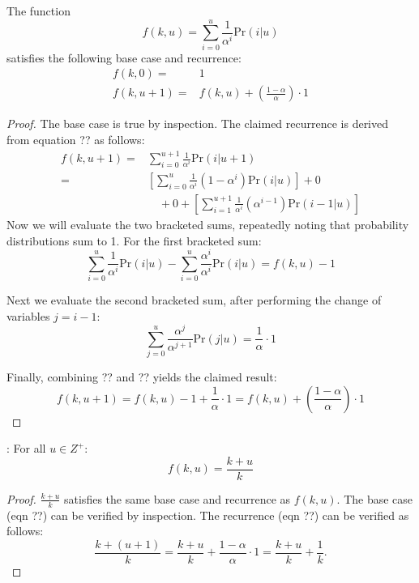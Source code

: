 \documentclass{sig-alternate}
\begin{document}
 The function
\[
f(k,u) = \sum_{i=0}^u \frac{1}{\alpha^i} \mathrm{Pr}(i|u)
\]
satisfies the following base case and recurrence:
\begin{align}
      f(k,0) = & 1 \\
f(k,u\!+\!1) = & f(k,u) + \left(\frac{1-\alpha}{\alpha}\right) \cdot 1
\end{align}
\begin{proof} The base case is true by inspection. The claimed recurrence is derived from equation ?? as follows:
\begin{align} 
  f(k,u\!+\!1)
= & \sum_{i=0}^{u+1} \frac{1}{\alpha^i} \mathrm{Pr}(i|u+1) \\
= & \left[ \sum_{i=0}^{u} \frac{1}{\alpha^i} (1-\alpha^i) \mathrm{Pr}(i|u) \right] + 0 \\
  & \quad + 0 + \left[ \sum_{i=1}^{u+1} \frac{1}{\alpha^i} (\alpha^{i-1}) \mathrm{Pr}(i\!-\!1|u) \right]
\end{align}
\noindent Now we will evaluate the two bracketed sums, repeatedly noting that probability distributions sum to 1.
For the first bracketed sum:
\begin{equation}
\sum_{i=0}^u \frac{1}{\alpha^i} \mathrm{Pr}(i|u) - \sum_{i=0}^u \frac{\alpha^i}{\alpha^i} \mathrm{Pr}(i|u) = f(k,u) - 1
\end{equation}

\noindent Next we evaluate the second bracketed sum, after performing the change of variables $j = i\!-\!1$:
\begin{equation}
\sum_{j=0}^{u} \frac{\alpha^j}{\alpha^{j+1}} \mathrm{Pr}(j|u) = \frac{1}{\alpha} \cdot 1
\end{equation}

Finally, combining ?? and ?? yields the claimed result:
\begin{equation}
  f(k,u\!+\!1) = f(k,u) - 1 + \frac{1}{\alpha} \cdot 1 = f(k,u) + \left(\frac{1-\alpha}{\alpha}\right) \cdot 1
\end{equation}
\end{proof}

: For all $u \in Z^+$:
\begin{equation}
f(k,u) = \frac{k+u}{k}
\end{equation}
\begin{proof}
$\frac{k+u}{k}$ satisfies the same base case and recurrence as $f(k,u)$.
The base case (eqn ??) can be verified by inspection. The recurrence (eqn ??) can be verified as follows:
\begin{equation}
\frac{k+(u+1)}{k} = \frac{k+u}{k} + \frac{1-\alpha}{\alpha} \cdot 1 = \frac{k+u}{k} + \frac{1}{k}.
\end{equation}
\end{proof}
\end{document}
